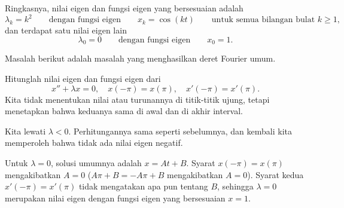 \begin{example}
Ringkasnya, nilai eigen dan fungsi eigen yang bersesuaian adalah
\begin{equation*}
\lambda_k = k^2 \qquad \text{dengan fungsi eigen} \qquad x_k = \cos (k t)
\qquad \text{untuk semua bilangan bulat } k \geq 1 ,
\end{equation*}
dan terdapat satu nilai eigen lain
\begin{equation*}
\lambda_0 = 0 \qquad \text{dengan fungsi eigen} \qquad x_0 = 1.
\end{equation*}
\end{example}

Masalah berikut adalah masalah yang menghasilkan deret Fourier
umum.

\begin{example} \label{bvp-periodic:example}
Hitunglah
nilai eigen dan fungsi eigen dari
\begin{equation*}
x'' + \lambda x = 0, \quad x(-\pi) = x(\pi), \quad x'(-\pi) = x'(\pi) .
\end{equation*}
Kita tidak menentukan nilai atau turunannya
di titik-titik ujung, tetapi menetapkan bahwa keduanya sama di awal dan
di akhir interval.

Kita lewati $\lambda < 0$.  Perhitungannya sama seperti sebelumnya,
dan kembali kita memperoleh
bahwa tidak ada nilai eigen negatif.

Untuk $\lambda = 0$, solusi umumnya adalah $x = At + B$.  Syarat
$x(-\pi) = x(\pi)$ mengakibatkan $A=0$ ($A\pi + B = -A\pi +B$ mengakibatkan $A=0$).
Syarat kedua $x'(-\pi) = x'(\pi)$ tidak mengatakan apa pun tentang $B$, sehingga
$\lambda=0$ merupakan nilai eigen dengan fungsi eigen yang bersesuaian $x=1$.


\end{example}
